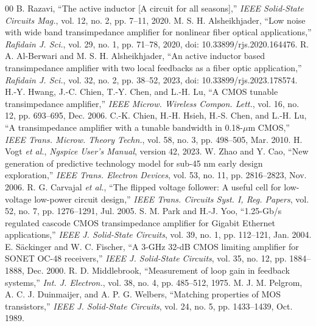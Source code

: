\documentclass[conference]{IEEEtran}
\begin{document}
\begin{thebibliography}{00}
 B. Razavi, ``The active inductor [A circuit for all seasons],'' \emph{IEEE Solid-State Circuits Mag.}, vol. 12, no. 2, pp. 7--11, 2020.
 M. S. H. Alsheikhjader, ``Low noise with wide band transimpedance amplifier for nonlinear fiber optical applications,'' \emph{Rafidain J. Sci.}, vol. 29, no. 1, pp. 71--78, 2020, doi: 10.33899/rjs.2020.164476.
 R. A. Al-Berwari and M. S. H. Alsheikhjader, ``An active inductor based transimpedance amplifier with two local feedbacks as a fiber optic application,'' \emph{Rafidain J. Sci.}, vol. 32, no. 2, pp. 38--52, 2023, doi: 10.33899/rjs.2023.178574.
 H.-Y. Hwang, J.-C. Chien, T.-Y. Chen, and L.-H. Lu, ``A CMOS tunable transimpedance amplifier,'' \emph{IEEE Microw. Wireless Compon. Lett.}, vol. 16, no. 12, pp. 693--695, Dec. 2006.
 C.-K. Chien, H.-H. Hsieh, H.-S. Chen, and L.-H. Lu, ``A transimpedance amplifier with a tunable bandwidth in 0.18-$\mu$m CMOS,'' \emph{IEEE Trans. Microw. Theory Techn.}, vol. 58, no. 3, pp. 498--505, Mar. 2010.
 H. Vogt \emph{et al.}, \emph{Ngspice User's Manual}, version 42, 2023.
 W. Zhao and Y. Cao, ``New generation of predictive technology model for sub-45 nm early design exploration,'' \emph{IEEE Trans. Electron Devices}, vol. 53, no. 11, pp. 2816--2823, Nov. 2006.
 R. G. Carvajal \emph{et al.}, ``The flipped voltage follower: A useful cell for low-voltage low-power circuit design,'' \emph{IEEE Trans. Circuits Syst. I, Reg. Papers}, vol. 52, no. 7, pp. 1276--1291, Jul. 2005.
 S. M. Park and H.-J. Yoo, ``1.25-Gb/s regulated cascode CMOS transimpedance amplifier for Gigabit Ethernet applications,'' \emph{IEEE J. Solid-State Circuits}, vol. 39, no. 1, pp. 112--121, Jan. 2004.
 E. S\"ackinger and W. C. Fischer, ``A 3-GHz 32-dB CMOS limiting amplifier for SONET OC-48 receivers,'' \emph{IEEE J. Solid-State Circuits}, vol. 35, no. 12, pp. 1884--1888, Dec. 2000.
 R. D. Middlebrook, ``Measurement of loop gain in feedback systems,'' \emph{Int. J. Electron.}, vol. 38, no. 4, pp. 485--512, 1975.
 M. J. M. Pelgrom, A. C. J. Duinmaijer, and A. P. G. Welbers, ``Matching properties of MOS transistors,'' \emph{IEEE J. Solid-State Circuits}, vol. 24, no. 5, pp. 1433--1439, Oct. 1989.
\end{thebibliography}
\end{document}
